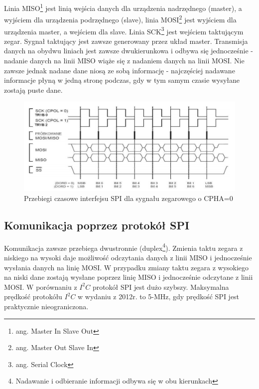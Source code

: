 \documentclass{xmgr}
\begin{document}
Linia MISO\footnote{ang. Master In Slave Out} jest linią wejścia danych dla urządzenia nadrzędnego (master), a wyjściem dla urządzenia podrzędnego (slave), linia MOSI\footnote{ang. Master Out Slave In} jest wyjściem dla urządzenia master, a wejściem dla slave. Linia SCK\footnote{ang. Serial Clock} jest wejściem taktującym zegar. Sygnał taktujący jest zawsze generowany przez układ master. Transmisja danych na obydwu liniach jest zawsze dwukierunkowa i odbywa się jednocześnie - nadanie danych na linii MISO wiąże się z nadaniem danych na linii MOSI. Nie zawsze jednak nadane dane niosą ze sobą informację - najczęściej nadawane informacje płyną w jedną stronę podczas, gdy w tym samym czasie wysyłane zostają puste dane.\cite{Dorra}

\begin{figure}[!h]
    \centering
    \includegraphics[height=0.25\textheight]{images/spi.png}
    \caption{Przebiegi czasowe interfejsu SPI dla sygnału zegarowego o CPHA=0}
\end{figure}

\subsection{Komunikacja poprzez protokół SPI}
Komunikacja zawsze przebiega dwustronnie (duplex\footnote{Nadawanie i odbieranie informacji odbywa się w obu kierunkach}). Zmienia taktu zegara z niskiego na wysoki daje możliwość odczytania danych z linii MISO i jednocześnie wysłania danych na linię MOSI. W przypadku zmiany taktu zegara z wysokiego na niski dane zostają wysłane poprzez linię MISO i jednocześnie odczytane z linii MOSI. W porównaniu z $I^2C$ protokół SPI jest dużo szybszy. Maksymalna prędkość protokółu $I^2C$ w wydaniu z 2012r. to 5-MHz, gdy prędkość SPI jest praktycznie nieograniczona.
\end{document}
